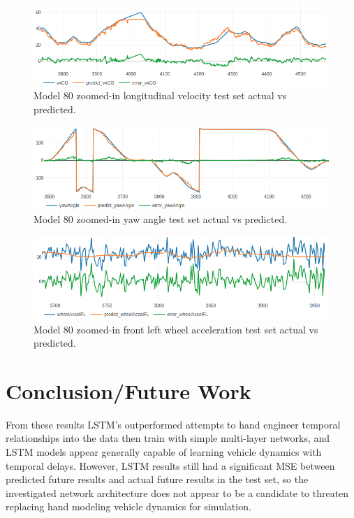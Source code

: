 \documentclass{article}
\begin{document}
\begin{figure}[!ht]
\includegraphics[width=\textwidth]{model80/zoom_vxCG.png}
\caption{Model 80 zoomed-in longitudinal velocity test set actual vs predicted.}
\label{fig:model80_zoom_vx}
\end{figure}

\begin{figure}[!ht]
\includegraphics[width=\textwidth]{model80/zoom_yawAngle.png}
\caption{Model 80 zoomed-in yaw angle test set actual vs predicted.}
\label{fig:model80_zoom_yaw}
\end{figure}

\begin{figure}[!ht]
\includegraphics[width=\textwidth]{model80/zoom_wheelAccelFL.png}
\caption{Model 80 zoomed-in front left wheel acceleration test set actual vs predicted.}
\label{fig:model80_zoom_wheel}
\end{figure}

\section{Conclusion/Future Work }
From these results LSTM's outperformed attempts to hand engineer temporal relationships into the data then train with simple multi-layer networks, and LSTM models appear generally capable of learning vehicle dynamics with temporal delays. However, LSTM results still had a significant MSE between predicted future results and actual future results in the test set, so the investigated network architecture does not appear to be a candidate to threaten replacing hand modeling vehicle dynamics for simulation.
\end{document}
